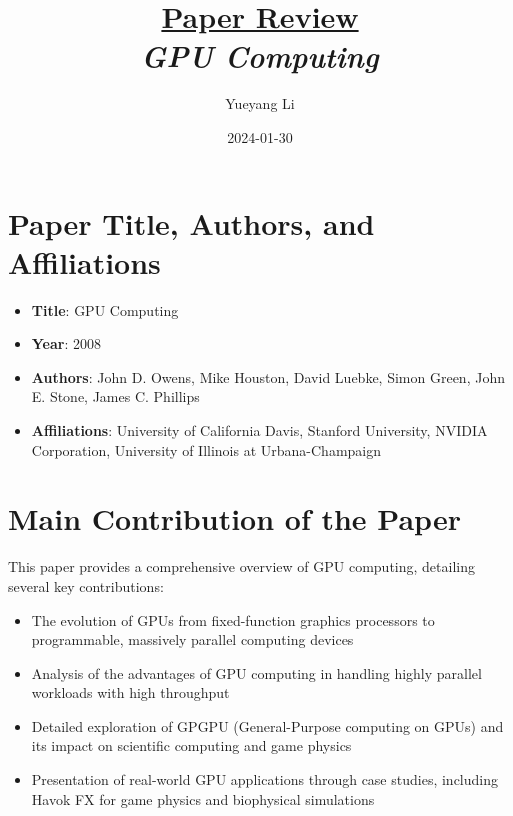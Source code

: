 \documentclass[12pt]{article}
\newcommand{\paperTitle}{
    \textit{\normalsize{GPU Computing}}  
}
\begin{document}
\title{\Large\uline{\textbf{Paper Review}} \\[0.4em]
\paperTitle{} 
}
\author{Yueyang Li}
\date{2024-01-30}

\maketitle

\section{Paper Title, Authors, and Affiliations}
\begin{itemize}[noitemsep]
    \item \textbf{Title}: GPU Computing
    \item \textbf{Year}: 2008
    \item \textbf{Authors}: John D. Owens, Mike Houston, David Luebke, Simon Green, John E. Stone, James C. Phillips
    \item \textbf{Affiliations}: University of California Davis, Stanford University, NVIDIA Corporation, University of Illinois at Urbana-Champaign
\end{itemize}

\section{Main Contribution of the Paper}
This paper provides a comprehensive overview of GPU computing, detailing several key contributions:
\begin{itemize}[noitemsep]
    \item The evolution of GPUs from fixed-function graphics processors to programmable, massively parallel computing devices
    \item Analysis of the advantages of GPU computing in handling highly parallel workloads with high throughput
    \item Detailed exploration of GPGPU (General-Purpose computing on GPUs) and its impact on scientific computing and game physics
    \item Presentation of real-world GPU applications through case studies, including Havok FX for game physics and biophysical simulations
\end{itemize}
\end{document}
